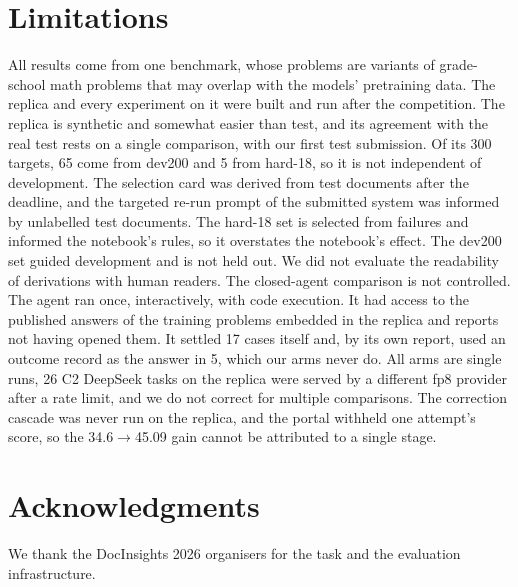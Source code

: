 \documentclass[11pt]{article}%
\begin{document}
\section*{Limitations}

All results come from one benchmark, whose problems are variants of
grade-school math problems that may overlap with the models' pretraining data.
The replica and every experiment on it were built and run after the
competition. The replica is synthetic and somewhat easier than test, and its agreement with the real test rests on a single comparison, with our first test submission. Of its 300
targets, 65 come from dev200 and 5 from hard-18, so it is not independent of
development. The selection card was derived from test documents after the
deadline, and the targeted re-run prompt of the submitted system was informed
by unlabelled test documents. The hard-18 set is selected from failures and
informed the notebook's rules, so it overstates the notebook's effect. The
dev200 set guided development and is not held out. We did not evaluate the
readability of derivations with human readers. The closed-agent comparison is
not controlled. The agent ran once, interactively, with code execution. It had
access to the published answers of the training problems embedded in the
replica and reports not having opened them. It settled 17 cases itself and, by
its own report, used an outcome record as the answer in 5, which our arms
never do. All arms are single runs, 26 \textsc{C2} DeepSeek tasks on the
replica were served by a different fp8 provider after a rate limit, and we do
not correct for multiple comparisons. The
correction cascade was never run on the replica, and the portal withheld one
attempt's score, so the 34.6$\rightarrow$45.09 gain cannot be attributed to a
single stage.

\section*{Acknowledgments}

We thank the DocInsights 2026 organisers for the task and the evaluation
infrastructure.
\end{document}
